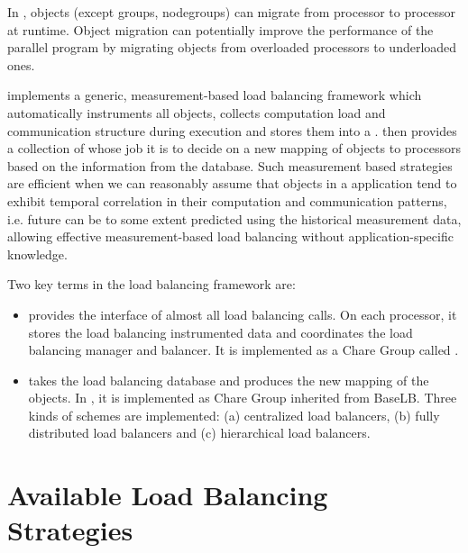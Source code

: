 In \charmpp{}, objects (except groups, nodegroups) can migrate from 
processor to processor at runtime. Object migration can potentially 
improve the performance of the parallel program by migrating objects from 
overloaded processors to underloaded ones. 


 \charmpp{} implements a generic, measurement-based load balancing framework
which automatically instruments all \charmpp{} objects, collects computation
load and communication structure during execution and stores them into a
. \charmpp{} then provides a collection of  whose job it is to decide on a new mapping of objects to
processors based on the information from the database.  Such measurement based
strategies are efficient when we can reasonably assume that objects in a 
\charmpp{} application tend to exhibit temporal correlation in their
computation and communication patterns, i.e. future can be to some extent
predicted using the historical measurement data, allowing effective
measurement-based load balancing without application-specific knowledge.

Two key terms in the \charmpp{} load balancing framework are:
\begin{itemize}
%
\item {} provides the interface of almost all load
balancing calls. On each processor, it stores the load balancing instrumented
data and coordinates the load balancing manager and balancer. It is implemented
as a Chare Group called .
%
\item {} takes the load balancing database and
produces the new mapping of the objects. In \charmpp{}, it is implemented as
Chare Group inherited from BaseLB. Three kinds of schemes are implemented: (a)
centralized load balancers, (b) fully distributed load balancers and (c)
hierarchical load balancers.
%
\end{itemize}

\section{Available Load Balancing Strategies}
\label{lbStrategy}

